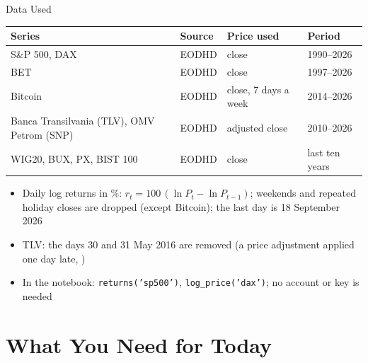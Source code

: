 \begin{frame}{Data Used}
\itemsize{\small}
\begin{center}
\footnotesize
\begin{tabular}{llll}
\toprule
\textbf{Series} & \textbf{Source} & \textbf{Price used} & \textbf{Period} \\
\midrule
S\&P 500, DAX & EODHD & close & 1990--2026 \\
BET & EODHD & close & 1997--2026 \\
Bitcoin & EODHD & close, 7 days a week & 2014--2026 \\
Banca Transilvania (TLV), OMV Petrom (SNP) & EODHD & adjusted close & 2010--2026 \\
WIG20, BUX, PX, BIST 100 & EODHD & close & last ten years \\
\bottomrule
\end{tabular}
\end{center}
\begin{itemize}
    \item Daily log returns in \%: $r_t = 100\,(\ln P_t - \ln P_{t-1})$; weekends and repeated holiday closes are dropped (except Bitcoin); the last day is 18 September 2026
    \item TLV: the days 30 and 31 May 2016 are removed (a price adjustment applied one day late, )
    \item In the notebook: \texttt{returns('sp500')}, \texttt{log\_price('dax')}; no account or key is needed
\end{itemize}
\end{frame}


\section{What You Need for Today}

